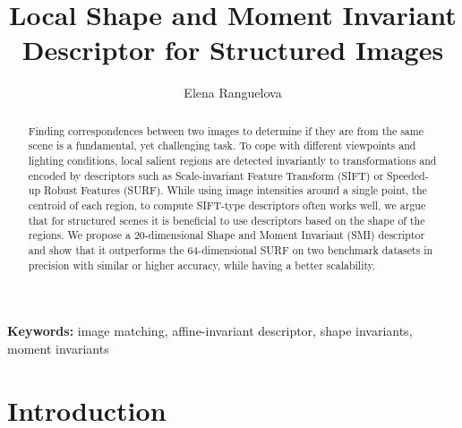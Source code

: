 \documentclass[a4paper,11pt]{article}
\begin{document}
\title{Local Shape and Moment Invariant Descriptor for Structured Images}


\author{Elena Ranguelova}
\date{}
\maketitle
\thispagestyle{empty}



\begin{abstract}
Finding correspondences between two images to determine if they are from the same scene is a fundamental, yet challenging task. To cope with different viewpoints and lighting conditions, local salient regions are detected invariantly to transformations and encoded by descriptors such as Scale-invariant Feature Transform (SIFT) or Speeded-up Robust Features (SURF). While using image intensities around a single point, the centroid of each region, to compute SIFT-type descriptors often works well, we argue that for structured scenes it is beneficial to use descriptors based on the shape of the regions. We propose a $20$-dimensional Shape and Moment Invariant (SMI) descriptor and show that it outperforms the $64$-dimensional SURF on two benchmark datasets in  precision with similar or higher accuracy, while having a better scalability.
\end{abstract}
\textbf{Keywords:} image matching, affine-invariant descriptor, shape invariants, moment invariants



\section{Introduction}
\end{document}
